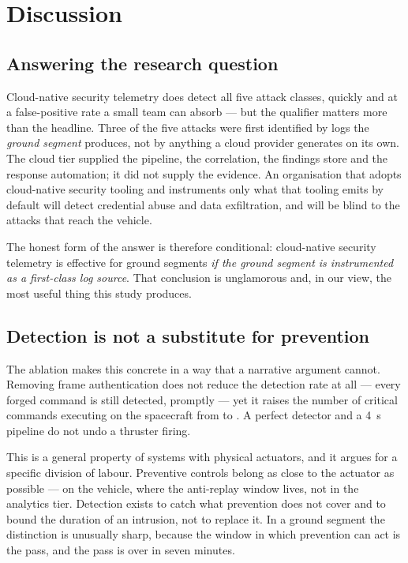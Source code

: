 \section{Discussion}
\label{sec:discussion}

\subsection{Answering the research question}

Cloud-native security telemetry does detect all five attack classes, quickly and
at a false-positive rate a small team can absorb --- but the qualifier matters
more than the headline. Three of the five attacks were first identified by logs
the \emph{ground segment} produces, not by anything a cloud provider generates on
its own. The cloud tier supplied the pipeline, the correlation, the findings
store and the response automation; it did not supply the evidence. An
organisation that adopts cloud-native security tooling and instruments only what
that tooling emits by default will detect credential abuse and data
exfiltration, and will be blind to the attacks that reach the vehicle.

The honest form of the answer is therefore conditional: cloud-native security
telemetry is effective for ground segments \emph{if the ground segment is
instrumented as a first-class log source}. That conclusion is unglamorous and, in
our view, the most useful thing this study produces.

\subsection{Detection is not a substitute for prevention}

The ablation makes this concrete in a way that a narrative argument cannot.
Removing frame authentication does not reduce the detection rate at all --- every
forged command is still detected, promptly --- yet it raises the number of
critical commands executing on the spacecraft from \AblFullCrit{} to
\AblNoSDLSCrit{}. A perfect detector and a \SI{4}{\second} pipeline do not undo a
thruster firing.

This is a general property of systems with physical actuators, and it argues for
a specific division of labour. Preventive controls belong as close to the
actuator as possible --- on the vehicle, where the anti-replay window lives, not
in the analytics tier. Detection exists to catch what prevention does not cover
and to bound the duration of an intrusion, not to replace it. In a ground segment
the distinction is unusually sharp, because the window in which prevention can
act is the pass, and the pass is over in seven minutes.

